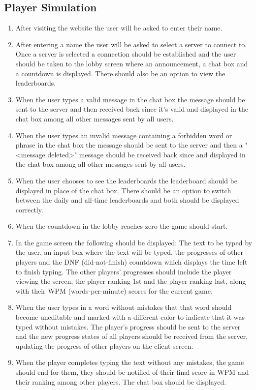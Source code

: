 \documentclass[titlepage]{article}
\begin{document}
\subsection{Player Simulation}
\begin{enumerate}
	\item After visiting the website the user will be asked to enter their name.
	\item After entering a name the user will be asked to select a server to connect to. Once a server is selected a connection should be established and the user should be taken to the lobby screen where an announcement, a chat box and a countdown is displayed. There should also be an option to view the leaderboards.
	\item When the user types a valid message in the chat box the message should be sent to the server and then received back since it's valid and displayed in the chat box among all other messages sent by all users.
	\item When the user types an invalid message containing a forbidden word or phrase in the chat box the message should be sent to the server and then a "<message deleted>" message should be received back since and displayed in the chat box among all other messages sent by all users.
	\item When the user chooses to see the leaderboards the leaderboard should be displayed in place of the chat box. There should be an option to switch between the daily and all-time leaderboards and both should be displayed correctly.
	\item When the countdown in the lobby reaches zero the game should start.
	\item In the game screen the following should be displayed: The text to be typed by the user, an input box where the text will be typed, the progresses of other players and the DNF (did-not-finish) countdown which displays the time left to finish typing. The other players' progresses should include the player viewing the screen, the player ranking 1st and the player ranking last, along with their WPM (words-per-minute) scores for the current game.
	\item When the user types in a word without mistakes that that word should become uneditable and marked with a different color to indicate that it was typed without mistakes. The player's progress should be sent to the server and the new progress states of all players should be received from the server, updating the progress of other players on the client screen.
	\item When the player completes typing the text without any mistakes, the game should end for them, they should be notified of their final score in WPM and their ranking among other players. The chat box should be displayed.

\end{enumerate}
\end{document}
